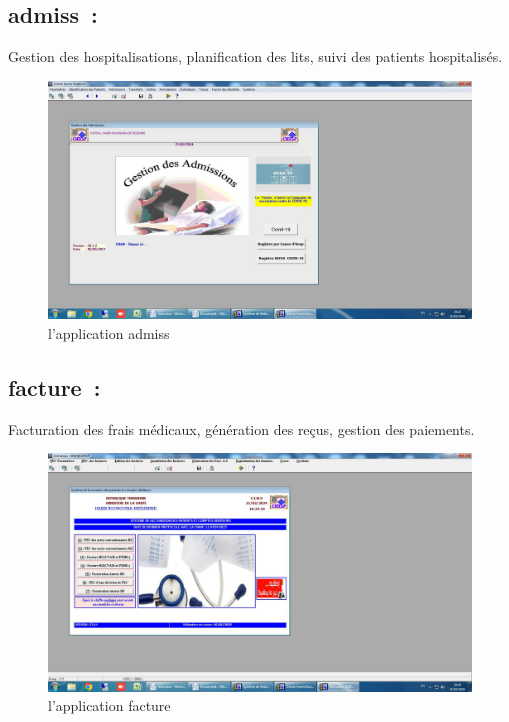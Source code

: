 \documentclass[12pt]{rapportINPTCLOUD}
\begin{document}
\subsection{admiss :} Gestion des hospitalisations, planification des lits, suivi des patients hospitalisés.
\begin{figure}[H]
\centering
\includegraphics[width=1\linewidth]{img/b.jpg}
\caption{l'application admiss}
\label{fig:admiss}
\end{figure}

\subsection{facture :}  Facturation des frais médicaux, génération des reçus, gestion des paiements.
\begin{figure}[H]
\centering
\includegraphics[width=1\linewidth]{img/c.jpg}
\caption{l'application facture}
\label{fig:facture}
\end{figure}
\end{document}
